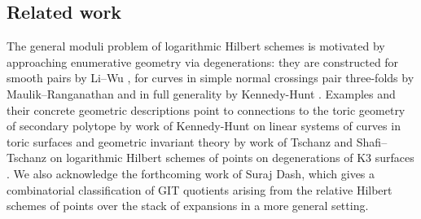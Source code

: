 \documentclass[10.5pt]{amsart}
\theoremstyle{definition}
\theoremstyle{definition}
\theoremstyle{definition}
\theoremstyle{definition}
\begin{document}




\subsection{Related work}
{The general moduli problem of logarithmic Hilbert schemes is motivated by approaching enumerative geometry via degenerations: they are constructed for smooth pairs by Li--Wu \cite{lw15}, for curves in simple normal crossings pair three-folds by Maulik--Ranganathan \cite{MR20} and in full generality by Kennedy-Hunt \cite{logquot}. Examples and their concrete geometric descriptions point to connections to the toric geometry of secondary polytope by work of Kennedy-Hunt on linear systems of curves in toric surfaces \cite{kh21} and geometric invariant theory by work of Tschanz and Shafi--Tschanz on logarithmic Hilbert schemes of points on degenerations of K3 surfaces \cite{tschanz2023, ST25}.} We also acknowledge the forthcoming work of Suraj Dash, which gives a combinatorial classification of GIT quotients arising from the relative Hilbert schemes of points over the stack of expansions in a more general setting.
\end{document}
